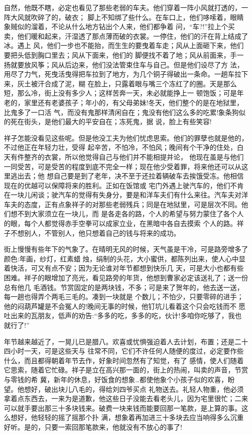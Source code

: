 \documentclass[11pt,a4paper,onecolumn]{article}
\begin{document}
自然，他既不瞎，必定也看见了那些老弱的车夫。他们穿着一阵小风就打透的，一阵大风就吹碎了的，破衣；
脚上不知绑了些什么。在车口上，他们哆嗦着，眼睛象贼似的溜着，不论从什么地方钻出个人来，他们都争着
问，``车?!''拉上个买卖，他们暖和起来，汗湿透了那点薄而破的衣裳。一停住，他们的汗在背上结成了冰。遇上
风，他们一步也不能抬，而生生的要曳着车走；风从上面砸下来，他们要把头低到胸口里去；风从下面来，他们的
脚便找不着了地；风从前面来，手一扬就要放风筝；风从后边来，他们没法管束住车与自己。但是他们设尽了方
法，用尽了力气，死曳活曳得把车拉到了地方，为几个铜子得破出一条命。一趟车拉下来，灰土被汗合成了泥，糊
在脸上，只露着眼与嘴三个冻红了的圈。天是那么短，那么冷，街上没有多少人；这样苦奔一天，未必就能挣上一
顿饱饭；可是年老的，家里还有老婆孩子；年小的，有父母弟妹!冬天，他们整个的是在地狱里，比鬼多了一口活
气，而没有鬼那样清闲自在；鬼没有他们这么多的吃累!象条狗似的死在街头，是他们最大的平安自在；冻死鬼，据
说，脸上有些笑容!

祥子怎能没看见这些呢。但是他没工夫为他们忧虑思索。他们的罪孽也就是他的，不过他正在年轻力壮，受得
起辛苦，不怕冷，不怕风；晚间有个干净的住处，白天有件整齐的衣裳，所以他觉得自己与他们并不能相提并论，
他现在虽是与他们一同受苦，可是受苦的程度到底不完全一样；现在他少受着罪，将来他还可以从这里逃出去；他
想自己要是到了老年，决不至于还拉着辆破车去挨饿受冻。他相信现在的优越可以保障将来的胜利。正如在饭馆或
宅门外遇上驶汽车的，他们不肯在一块儿闲谈；驶汽车的觉得有失身分，要是和洋车夫们有什么来往。汽车夫对洋
车夫的态度，正有点象祥子的对那些老弱残兵；同是在地狱里，可是层次不同。他们想不到大家须立在一块儿，而
是各走各的路，个人的希望与努力蒙住了各个人的眼，每个人都觉得赤手空拳可以成家立业，在黑暗中各自去摸索
个人的路。祥子不想别人，不管别人，他只想着自己的钱与将来的成功。

街上慢慢有些年下的气象了。在晴明无风的时候，天气虽是干冷，可是路旁增多了颜色:年画，纱灯，红素蜡
烛，绢制的头花，大小蜜供，都陈列出来，使人心中显着快活，可又有点不安；因为无论谁对年节都想到快乐几
天，可是大小也都有些困难。祥子的眼增加了亮光，看见路旁的年货，他想到曹家必定该送礼了；送一份总有他几
毛酒钱。节赏固定的是两块钱，不多；可是来了贺年的，他去送一送，每一趟也得弄个两毛三毛的。凑到一块就是
个数儿；不怕少，只要零碎的进手；他的闷葫芦罐是不会冤人的!晚间无事的时候，他钉坑儿看着这个只会吃钱而不
愿吐出来的瓦朋友，低声的劝告:``多多的吃，多多的吃，伙计!多咱你吃够了，我也就行了!''

年节越来越近了，一晃儿已是腊八。欢喜或忧惧强迫着人去计划，布置；还是二十四小时一天，可是这些天与
往常不同，它们不许任何人随便的度过，必定要作些什么，而且都得朝着年节去作，好象时间忽然有了知觉，有了
感情，使人们随着它思索，随着它忙碌。祥子是立在高兴那一面的，街上的热闹，叫卖的声音，节赏与零钱的希
冀，新年的休息，好饭食的想象\ldots 都使他象个小孩子似的欢喜，盼望。他想好，破出块儿八毛的，得给刘四爷买点
礼物送去。礼轻人物重，他必须拿着点东西去，一来为是道歉，他这些日子没能去看老头儿，因为宅里很忙；二来
可以就手要出那三十多块钱来。破费一块来钱而能要回那一笔款，是上算的事。这么想好，他轻轻的摇了摇那个扑
满，想象着再加进三十多块去应当响得多么沉重好听。是的，只要一索回那笔款来，他就没有不放心的事了!
\end{document}
